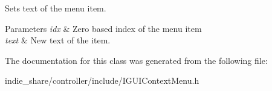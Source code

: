 Sets text of the menu item. 


\begin{DoxyParams}{Parameters}
{\em idx} & Zero based index of the menu item \\
\hline
{\em text} & New text of the item. \\
\hline
\end{DoxyParams}


The documentation for this class was generated from the following file\+:\begin{DoxyCompactItemize}
\item 
indie\+\_\+share/controller/include/I\+G\+U\+I\+Context\+Menu.\+h\end{DoxyCompactItemize}
